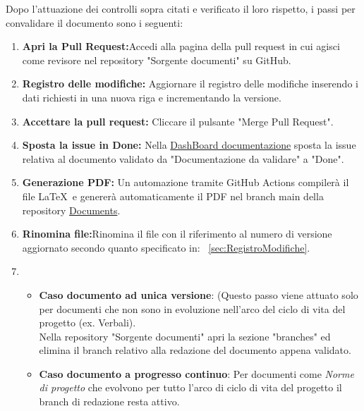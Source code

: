 \documentclass{article}
\begin{document}
Dopo l'attuazione dei controlli sopra citati e verificato il loro rispetto, i passi per convalidare il documento sono i seguenti:
\begin{enumerate}
 \item \textbf{Apri la Pull Request:}Accedi alla pagina della pull request in cui agisci come revisore nel repository "Sorgente documenti" su GitHub.
  \item \textbf{Registro delle modifiche:} Aggiornare il registro delle modifiche inserendo i dati richiesti in  una nuova riga e incrementando la versione.
    \item \textbf{Accettare la pull request:} Cliccare il pulsante "Merge Pull Request".
     \item \textbf{Sposta la issue in Done:} Nella \href{https://github.com/orgs/ByteOps-swe/projects/1/views/1}{DashBoard documentazione} sposta la issue relativa al documento validato da "Documentazione da validare" a "Done".
     \item \textbf{Generazione PDF:} Un automazione tramite GitHub Actions compilerà il file   \LaTeX\ e genererà automaticamente il PDF nel branch main della repository \href{https://github.com/ByteOps-swe/Documents}{Documents}. 
     \item \textbf{Rinomina file:}Rinomina il file con il riferimento al numero di versione aggiornato secondo quanto specificato in: ~\ref{sec:RegistroModifiche}.
     \item \begin{itemize} \item \textbf{Caso documento ad unica versione}:
      (Questo passo viene attuato solo per documenti che non sono in evoluzione nell'arco del ciclo di vita del progetto (ex. Verbali).\\Nella repository "Sorgente documenti" apri la sezione "branches" ed elimina il branch relativo alla redazione del documento appena validato.
    
      \item \textbf{Caso documento a progresso continuo}: Per documenti come \textit{Norme di progetto} che evolvono per tutto l'arco di ciclo di vita del progetto il branch di redazione resta attivo. 
    \end{itemize}
     
\end{enumerate}
\end{document}
